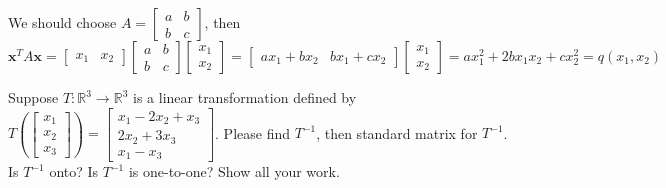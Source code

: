 \documentclass[a4paper,10pt]{article}
\begin{document}
\begin{solution}
We should choose $A=\begin{bmatrix}
a&b\\b&c
\end{bmatrix}$, then
\[
\mathbf x^TA\mathbf x=\begin{bmatrix}
x_1&x_2
\end{bmatrix}\begin{bmatrix}
a&b\\b&c
\end{bmatrix}\begin{bmatrix}
x_1\\x_2
\end{bmatrix}=\begin{bmatrix}
ax_1+bx_2&bx_1+cx_2
\end{bmatrix}\begin{bmatrix}
x_1\\x_2
\end{bmatrix}=ax_1^2+2bx_1x_2+cx_2^2=q(x_1,x_2)
\]
\end{solution}

\begin{problem}
Suppose $T:\mathbb R^3\to\mathbb R^3$ is a linear transformation defined by $T\left(\begin{bmatrix}x_1\\x_2\\x_3\end{bmatrix}\right)=\begin{bmatrix}x_1-2x_2+x_3\\2x_2+3x_3\\x_1-x_3\end{bmatrix}$. Please find $T^{-1}$, then standard matrix for $T^{-1}$. Is $T^{-1}$ onto? Is $T^{-1}$ is one-to-one? Show all your work.
\end{problem}
\end{document}
